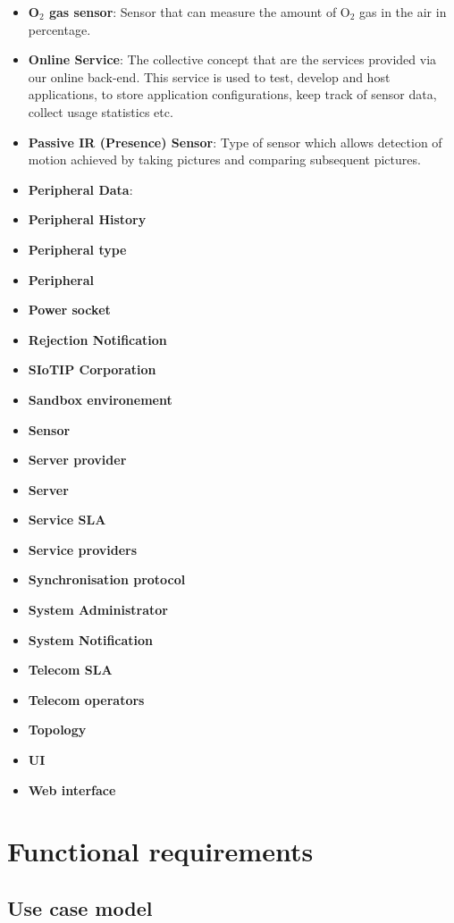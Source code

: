 \documentclass[english]{sareport}
\begin{document}
\begin{itemize}
	\item \textbf{O$_2$ gas sensor}: Sensor that can measure the amount of O$_2$ gas in the air  in percentage.
	\item \textbf{Online Service}: The collective concept that are the services provided via our online back-end. This service is used to test, develop and host applications, to store application configurations, keep track of sensor data, collect usage statistics etc. 
	\item \textbf{Passive IR (Presence) Sensor}: Type of sensor which allows detection of motion achieved by taking pictures and comparing subsequent pictures.
	\item \textbf{Peripheral Data}: 
	\item \textbf{Peripheral History}
	\item \textbf{Peripheral type}
	\item \textbf{Peripheral}
	\item \textbf{Power socket}
	\item \textbf{Rejection Notification}
	\item \textbf{SIoTIP Corporation}
	\item \textbf{Sandbox environement}
	\item \textbf{Sensor}
	\item \textbf{Server provider}
	\item \textbf{Server}
	\item \textbf{Service SLA}
	\item \textbf{Service providers}
	\item \textbf{Synchronisation protocol}
	\item \textbf{System Administrator}
	\item \textbf{System Notification}
	\item \textbf{Telecom SLA}
	\item \textbf{Telecom operators}
	\item \textbf{Topology}
	\item \textbf{UI}
	\item \textbf{Web interface}
\end{itemize}

\chapter{Functional requirements}\label{sec:functional}
\section*{Use case model}
\end{document}
